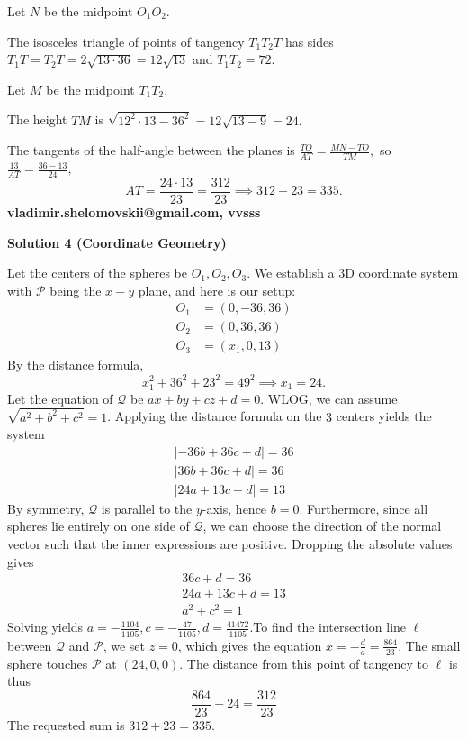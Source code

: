 \begin{enumerate}
 Let $N$ be the midpoint  $O_1 O_2$.

 The isosceles triangle of points of tangency $T_1 T_2 T$  has sides $T_1 T = T_2 T = 2 \sqrt{13 \cdot 36} = 12 \sqrt{13}$ and $T_1 T_2 = 72.$ 

 Let $M$ be the midpoint $T_1 T_2.$

 The height $TM$  is $\sqrt {12^2 \cdot 13 - 36^2} = 12 \sqrt {13-9} = 24.$

 The tangents of the half-angle between the planes is $\frac {TO}{AT} = \frac {MN - TO}{TM},$ so $\frac {13}{AT} = \frac {36 - 13}{24},$ 
 \[AT = \frac{24\cdot 13}{23} = \frac {312}{23} \implies  312 + 23 = \boxed{335}.\]\textbf{vladimir.shelomovskii@gmail.com, vvsss}

 



\textbf{Solution 4 (Coordinate Geometry)}

Let the centers of the spheres be $O_1,O_2,O_3$. We establish a 3D coordinate system with $\mathcal{P}$ being the $x-y$ plane, and here is our setup:\begin{align*}O_1&=(0,-36,36)\\O_2&=(0,36,36)\\O_3&=(x_1,0,13)\end{align*}
By the distance formula, 
 \[x_{1}^{2}+36^2+23^2=49^2\implies x_{1}=24.\]Let the equation of $\mathcal{Q}$ be $ax+by+cz+d=0$. WLOG, we can assume $\sqrt{a^{2}+b^{2}+c^2}=1$. Applying the distance formula on the $3$ centers yields the system\begin{align*}\lvert -36b+36c+d\rvert=36\\\lvert 36b+36c+d\rvert=36\\\lvert 24a+13c+d\rvert=13\end{align*}
By symmetry, $\mathcal{Q}$ is parallel to the $y$-axis, hence $b=0$. Furthermore, since all spheres lie entirely on one side of $\mathcal{Q}$, we can choose the direction of the normal vector such that the inner expressions are positive. Dropping the absolute values gives\begin{align*}36c+d=36\\24a+13c+d=13\\a^{2}+c^{2}=1\end{align*}
Solving yields $a=-\frac{1104}{1105},c=-\frac{47}{1105},d=\frac{41472}{1105}$.To find the intersection line $\ell$ between $\mathcal{Q}$ and $\mathcal{P}$, we set $z=0$, which gives the equation $x=-\frac{d}{a}=\frac{864}{23}$. The small sphere touches $\mathcal{P}$ at $(24,0,0)$. The distance from this point of tangency to $\ell$ is thus 
 \[\frac{864}{23}-24=\frac{312}{23}\]The requested sum is $312+23=\boxed{335}$.


\end{enumerate}
